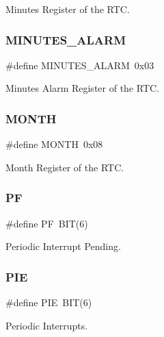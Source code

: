 Minutes Register of the R\+TC. 

\mbox{\label{group__rtc_gadc030279159b8e16a47d21e393547689}} 
\subsubsection{\texorpdfstring{M\+I\+N\+U\+T\+E\+S\+\_\+\+A\+L\+A\+RM}{MINUTES\_ALARM}}
{\footnotesize\ttfamily \#define M\+I\+N\+U\+T\+E\+S\+\_\+\+A\+L\+A\+RM~0x03}



Minutes Alarm Register of the R\+TC. 

\mbox{\label{group__rtc_ga3729d06495d9713592f79f3122c9e677}} 
\subsubsection{\texorpdfstring{M\+O\+N\+TH}{MONTH}}
{\footnotesize\ttfamily \#define M\+O\+N\+TH~0x08}



Month Register of the R\+TC. 

\mbox{\label{group__rtc_gaa0e278c26c25558741febfadd7216caa}} 
\subsubsection{\texorpdfstring{PF}{PF}}
{\footnotesize\ttfamily \#define PF~B\+IT(6)}



Periodic Interrupt Pending. 

\mbox{\label{group__rtc_gac40c2b49eb51e2adc237b530adfcadf4}} 
\subsubsection{\texorpdfstring{P\+IE}{PIE}}
{\footnotesize\ttfamily \#define P\+IE~B\+IT(6)}



Periodic Interrupts. 

